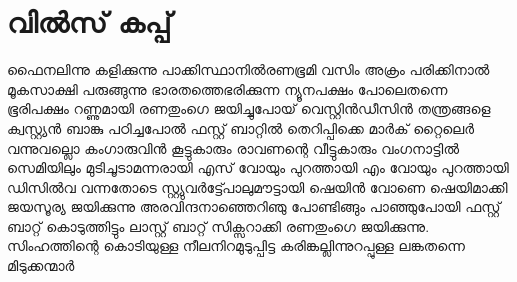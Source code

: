 \section{വിൽസ് കപ്പ്}
\obeylines
\noindent
ഫൈനലിന്നു കളിക്കുന്നു
പാക്കിസ്ഥാനിൽരണഭൂമി
വസിം അക്രം പരിക്കിനാൽ 
മൂകസാക്ഷി പരുങ്ങുന്നു
ഭാരതത്തെഭരിക്കുന്ന 
ന്യൂനപക്ഷം പോലെതന്നെ
ഭൂരിപക്ഷം റണ്ണുമായി 
രണതുംഗെ ജയിച്ചുപോയ്
വെസ്റ്റിൻഡീസിൻ തന്ത്രങ്ങളെ
ക്വസ്റ്റ്യൻ ബാങ്കു പഠിച്ചപോൽ
ഫസ്റ്റ് ബാറ്റിൽ തെറിപ്പിക്കെ
മാർക് റ്റൈലെർ വന്നുവല്ലൊ
കംഗാരുവിൻ കൂട്ടുകാരും 
രാവണന്റെ വീട്ടുകാരും
വംഗനാട്ടിൽ സെമിയിലും
മുടിചൂടാമന്നരായി
എസ് വോയും പുറത്തായി
എം വോയും പുറത്തായി
ഡിസിൽവ വന്നതോടെ
സ്റ്റ്യുവർട്ട്പോലുമൗട്ടായി
ഷെയിൻ വോണെ ഷെയിമാക്കി
ജയസൂര്യ ജയിക്കുന്നു
അരവിന്ദനാഞ്ഞെറിഞു
പോണ്ടിങ്ങും പാഞ്ഞുപോയി
ഫസ്റ്റ് ബാറ്റ് കൊടുത്തിട്ടും
ലാസ്റ്റ് ബാറ്റ് സിക്സറാക്കി
രണതുംഗെ ജയിക്കുന്നു.
സിംഹത്തിന്റെ കൊടിയുള്ള
നീലനിറമുടുപ്പിട്ട
കരിങ്കല്ലിന്നുറപ്പുള്ള
ലങ്കതന്നെ മിടുക്കന്മാർ
